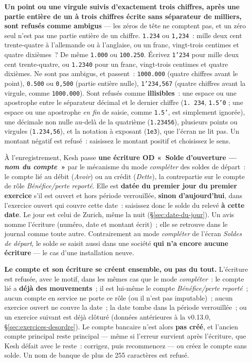 \documentclass[a4paper,11pt,oneside]{article}
\begin{document}
\textbf{Un point ou une virgule suivis d'exactement trois chiffres, après une partie entière de un à trois chiffres écrite sans séparateur de milliers, sont refusés comme ambigus} --- les zéros de tête ne comptent pas, et un zéro seul n'est pas une partie entière de un chiffre. \texttt{1.234} ou \texttt{1,234}~: mille deux cent trente-quatre à l'allemande ou à l'anglaise, ou un franc, vingt-trois centimes et quatre dixièmes~? De même \texttt{1.000} ou \texttt{100.250}. Écrivez \texttt{1'234} pour mille deux cent trente-quatre, ou \texttt{1.2340} pour un franc, vingt-trois centimes et quatre dixièmes. Ne sont pas ambigus, et passent~: \texttt{1000.000} (quatre chiffres avant le point), \texttt{0.500} ou \texttt{0,500} (partie entière nulle), \texttt{1'234,567} (quatre chiffres avant la virgule, comme \texttt{1000.000}). Sont refusés comme \textbf{illisibles}~: une espace ou une apostrophe entre le séparateur décimal et le dernier chiffre (\texttt{1.\ 234}, \texttt{1.5'0} ; une espace ou une apostrophe \emph{en fin} de saisie, comme \texttt{1.5'}, est simplement ignorée), une décimale non nulle au-delà de la quatrième (\texttt{1.23456}), plusieurs points ou virgules (\texttt{1.234,56}), et la notation à exposant (\texttt{1e3}), que l'écran ne lit pas. Un montant négatif est refusé~: saisissez le montant positif et choisissez le sens.

À l'enregistrement, Kesh passe \textbf{une écriture OD «~Solde d'ouverture --- \emph{nom du compte}~»} par le mécanisme du mode \emph{compléter} des soldes de départ~: le compte lié au débit (\emph{Avoir}) ou au crédit (\emph{Dette}), la contrepartie sur le compte de rôle \emph{Bénéfice/perte reporté}. Elle est \textbf{datée du premier jour du premier exercice} s'il est ouvert et hors période verrouillée, \textbf{sinon d'aujourd'hui}, dans l'exercice ouvert qui couvre cette date~: saisissez donc le solde du relevé \textbf{à cette date}. Le jour est celui de Zurich, même la nuit (\S\ref{sec:date-du-jour}). Un avis nomme l'écriture (numéro, date et montant écrit)~; elle se retrouve dans le journal comme toute autre. Contrairement au mode \emph{compléter} de l'écran \emph{Soldes de départ}, le solde se saisit aussi dans une société \textbf{qui n'a encore aucune écriture} --- le cas d'une installation neuve.

\textbf{Le compte et son écriture se créent ensemble, ou pas du tout.} L'écriture est refusée, avec le motif, dans les mêmes cas que le mode \emph{compléter}~: le compte lié a \textbf{déjà des mouvements}~; il est lui-même le compte \emph{Bénéfice/perte reporté}~; aucun compte en service ne porte ce rôle (ou il n'est pas imputable)~; aucun exercice ouvert ne couvre la date~; la date tombe dans la période verrouillée~; ou un exercice suivant est déjà clôturé (données antérieures à la v0.13.0, \S\ref{sec:exercices-desordre}). Le compte bancaire n'est alors \textbf{pas créé}, et l'ancien compte principal reste principal --- même si l'erreur survient après l'écriture, que Kesh défait avec le reste~: corrigez, puis recommencez --- ou créez le compte sans solde. Un nom de banque de plus de 255 caractères est refusé.
\end{document}
